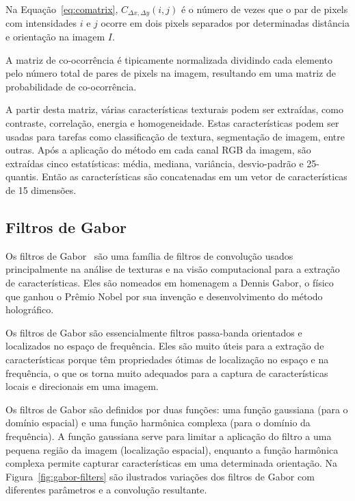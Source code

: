 Na Equação~\ref{eq:comatrix}, $C_{\Delta x, \Delta y}(i,j)$ é o número de vezes
que o par de pixels com intensidades $i$ e $j$ ocorre em dois pixels
separados por determinadas distância e orientação na imagem $I$.

A matriz de co-ocorrência é tipicamente normalizada dividindo cada
elemento pelo número total de pares de pixels na imagem, resultando em
uma matriz de probabilidade de co-ocorrência.

A partir desta matriz, várias características texturais podem ser
extraídas, como contraste, correlação, energia e homogeneidade. Estas
características podem ser usadas para tarefas como classificação de
textura, segmentação de imagem, entre outras. Após a aplicação do
método em cada canal RGB da imagem, são extraídas cinco estatísticas: média,
mediana, variância, desvio-padrão e 25-quantis. Então as
características são concatenadas em um vetor de características de 15 dimensões.

\subsection{Filtros de Gabor}\label{sec:filtros-gabor}

Os filtros de Gabor~\cite{daugman1988complete} são uma família de filtros
de convolução usados principalmente na análise de texturas e na visão
computacional para a extração de características. Eles são nomeados em
homenagem a Dennis Gabor, o físico que ganhou o Prêmio Nobel por sua
invenção e desenvolvimento do método holográfico.

Os filtros de Gabor são essencialmente filtros passa-banda orientados
e localizados no espaço de frequência. Eles são muito úteis para a
extração de características porque têm propriedades ótimas de
localização no espaço e na frequência, o que os torna muito adequados
para a captura de características locais e direcionais em uma imagem.

Os filtros de Gabor são definidos por duas funções: uma função
gaussiana (para o domínio espacial) e uma função harmônica complexa
(para o domínio da frequência). A função gaussiana serve para limitar
a aplicação do filtro a uma pequena região da imagem (localização
espacial), enquanto a função harmônica complexa permite capturar
características em uma determinada orientação. Na
Figura~\ref{fig:gabor-filters} são ilustrados variações dos
filtros de Gabor com diferentes parâmetros e a convolução resultante.

